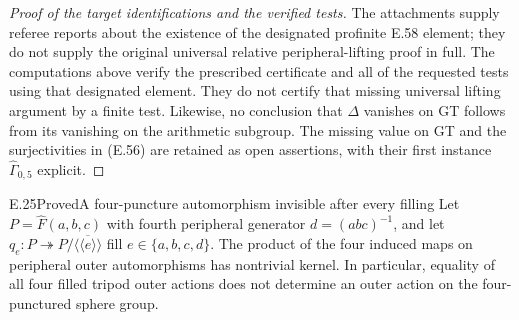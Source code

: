 \begin{proof}[Proof of the target identifications and the verified tests]
The attachments supply referee reports about the
existence of the designated profinite E.58 element;
they do not supply the original universal relative
peripheral-lifting proof in full.  The computations
above verify the prescribed certificate and all
of the requested tests using that designated
element.  They do not certify that missing
universal lifting argument by a finite test.
Likewise, no conclusion that $\Delta$ vanishes
on GT follows from its vanishing on the
arithmetic subgroup.  The missing value on GT
and the surjectivities in (E.56) are retained as
open assertions, with their first instance
$\widehat\Gamma_{0,5}$ explicit.
\end{proof}

\begin{result}{E.25}{Proved}{A four-puncture automorphism invisible after every filling}
Let $P=\widehat F(a,b,c)$ with fourth peripheral generator
$d=(abc)^{-1}$, and let $q_e:P\twoheadrightarrow
P/\overline{\langle\!\langle e\rangle\!\rangle}$ fill
$e\in\{a,b,c,d\}$.  The product of the four induced
maps on peripheral outer automorphisms has nontrivial
kernel.  In particular, equality of all four filled
tripod outer actions does not determine an outer action
on the four-punctured sphere group.
\end{result}
